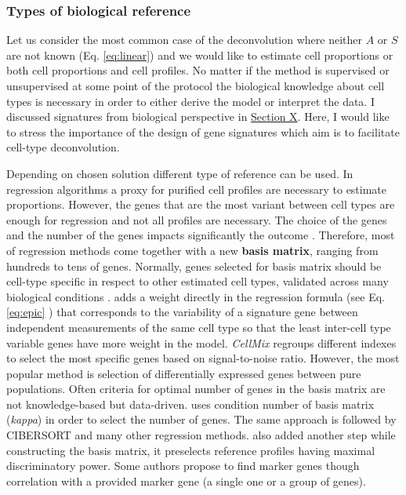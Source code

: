 \documentclass[12pt,]{book}
\theoremstyle{definition}
\theoremstyle{definition}
\theoremstyle{definition}
\theoremstyle{remark}
\begin{document}
\hypertarget{types-of-biological-reference}{%
\subsubsection{Types of biological
reference}\label{types-of-biological-reference}}

Let us consider the most common case of the deconvolution where neither
\(A\) or \(S\) are not known (Eq. \eqref{eq:linear}) and we would like to
estimate cell proportions or both cell proportions and cell profiles. No
matter if the method is supervised or unsupervised at some point of the
protocol the biological knowledge about cell types is necessary in order
to either derive the model or interpret the data. I discussed signatures
from biological perspective in
\protect\hyperlink{immune-signatures}{Section X}. Here, I would like to
stress the importance of the design of gene signatures which aim is to
facilitate cell-type deconvolution.

Depending on chosen solution different type of reference can be used. In
regression algorithms a proxy for purified cell profiles are necessary
to estimate proportions. However, the genes that are the most variant
between cell types are enough for regression and not all profiles are
necessary. The choice of the genes and the number of the genes impacts
significantly the outcome \citep{Vallania2017}. Therefore, most of
regression methods come together with a new \textbf{basis matrix},
ranging from hundreds to tens of genes. Normally, genes selected for
basis matrix should be cell-type specific in respect to other estimated
cell types, validated across many biological conditions
\citep{Hoffmann2006}. \citet{Racle2017} adds a weight directly in the
regression formula (see Eq. \eqref{eq:epic} ) that corresponds to the
variability of a signature gene between independent measurements of the
same cell type so that the least inter-cell type variable genes have
more weight in the model. \emph{CellMix} \citep{Gaujoux2013} regroups
different indexes to select the most specific genes based on
signal-to-noise ratio. However, the most popular method is selection of
differentially expressed genes between pure populations. Often criteria
for optimal number of genes in the basis matrix are not knowledge-based
but data-driven. \citet{Abbas2009} uses condition number of basis matrix
(\emph{kappa}) in order to select the number of genes. The same approach
is followed by CIBERSORT and many other regression methods.
\citet{Newman2015} also added another step while constructing the basis
matrix, it preselects reference profiles having maximal discriminatory
power. Some authors \citep{Ju2013, Nelms2016} propose to find marker
genes though correlation with a provided marker gene (a single one or a
group of genes).
\end{document}
